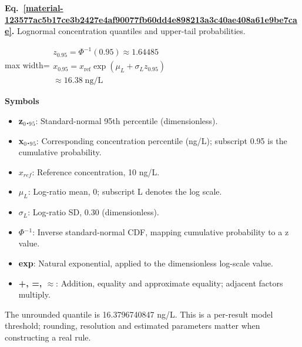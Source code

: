 \documentclass[11pt,a4paper]{article}
\begin{document}
\par\medskip
\noindent\begin{minipage}{\linewidth}
\label{material-123577ac5b17ce3b2427e4af90077fb60dd4e898213a3c40ae408a61e9be7cae}
\noindent\textbf{Eq.~\ref*{material-123577ac5b17ce3b2427e4af90077fb60dd4e898213a3c40ae408a61e9be7cae}.} Lognormal concentration quantiles and upper-tail probabilities.\par\nopagebreak
\begin{center}\begin{adjustbox}{max width=\linewidth}$\displaystyle \begin{gathered}z_{0.95}=\Phi^{-1}(0.95)\approx1.64485\\x_{0.95}=x_{\mathrm{ref}}\exp(\mu_L+\sigma_L z_{0.95})\\\approx16.38\;\mathrm{ng/L}\end{gathered}$\end{adjustbox}\end{center}

\par\noindent\textbf{Symbols}

\begin{itemize}\setlength{\itemsep}{1pt}\setlength{\parsep}{0pt}
\item \textbf{z\ensuremath{{}_0}.\ensuremath{{}_9}\ensuremath{{}_5}}: Standard-normal 95th percentile (dimensionless).
\item \textbf{x\ensuremath{{}_0}.\ensuremath{{}_9}\ensuremath{{}_5}}: Corresponding concentration percentile (ng/L); subscript 0.95 is the cumulative probability.
\item \textbf{\(x_{ref}\)}: Reference concentration, 10 ng/L.
\item \textbf{\(μ_L\)}: Log-ratio mean, 0; subscript L denotes the log scale.
\item \textbf{\(σ_L\)}: Log-ratio SD, 0.30 (dimensionless).
\item \textbf{\ensuremath{\Phi}\ensuremath{{}^-}\ensuremath{{}^1}}: Inverse standard-normal CDF, mapping cumulative probability to a z value.
\item \textbf{exp}: Natural exponential, applied to the dimensionless log-scale value.
\item \textbf{+, =, \ensuremath{\approx}}: Addition, equality and approximate equality; adjacent factors multiply.
\end{itemize}

The unrounded quantile is 16.3796740847 ng/L. This is a per-result model threshold; rounding, resolution and estimated parameters matter when constructing a real rule.

\end{minipage}\par
\medskip
\end{document}

